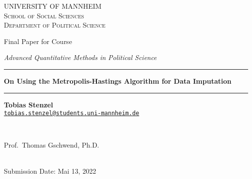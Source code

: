 \documentclass[12pt,english,a4paper,oneside]{article}
\theoremstyle{definition}
\theoremstyle{definition}
\theoremstyle{definition}
\theoremstyle{definition}
\theoremstyle{remark}
\begin{document}
\begin{titlepage}

    \begin{center}
    \large{ \textsc{ \uppercase{University of Mannheim} \\ \vspace{-0.2cm}
School of Social Sciences \\ \vspace{-0.2cm}
Department of Political Science}}

      
        \vspace{3.5cm}
        

       \large{   Final Paper for Course   }


       \large{ \textit{   Advanced Quantitative Methods in Political Science   }}

\renewcommand{\linethickness}{0.03em}
\rule{\linewidth}{\linethickness}


       \LARGE{ \textbf{   On Using the Metropolis-Hastings Algorithm for Data Imputation   }}


       \large{  }

        \vspace{-0.2cm}
\rule{\linewidth}{\linethickness}


\begin{minipage}[t]{0.5\textwidth}
\begin{flushleft}
\singlespacing
 \textbf{Tobias Stenzel}  \\ 


 \href{mailto:tobias.stenzel@students.uni-mannheim.de}{\nolinkurl{tobias.stenzel@students.uni-mannheim.de}}  \\ 

\end{flushleft}
\end{minipage}
\begin{minipage}[t]{0.4\textwidth}
\hfill
\end{minipage}\\
\vspace{0.2cm}
\begin{minipage}[t]{0.35\textwidth}
\hfill
\end{minipage}
\begin{minipage}[t]{0.55\textwidth}
\begin{flushright}
\singlespacing
     Prof.~Thomas Gschwend, Ph.D.  \\       

\end{flushright}
\end{minipage}\\
%


         \vfill
         Submission Date: Mai 13, 2022 \\ 
        





         \vfill



     \end{center}
    \thispagestyle{empty}
\end{titlepage}
\end{document}
